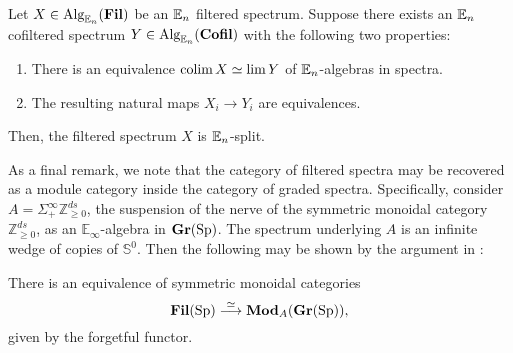 \begin{thm}\label{thm:SplitMachine}%
Let $X\in \operatorname{\text{Alg}}_{\operatorname{\mathbb{E}}_n}(\operatorname{\textbf{Fil}})$ be an $\operatorname{\mathbb{E}}_n$ filtered spectrum.  Suppose there exists an $\operatorname{\mathbb{E}}_n$ cofiltered spectrum $Y\in \operatorname{\text{Alg}}_{\operatorname{\mathbb{E}}_n}(\operatorname{\textbf{Cofil}})$ with the following two properties:
\begin{enumerate}
\item There is an equivalence $\operatorname*{\text{colim}} X \simeq \lim Y$ of $\operatorname{\mathbb{E}}_n$-algebras in spectra.
\item The resulting natural maps $X_i \to Y_i$ are equivalences.  
\end{enumerate}
Then, the filtered spectrum $X$ is $\operatorname{\mathbb{E}}_n$-split.
\end{thm}


As a final remark, we note that the category of filtered spectra may be recovered as a module category inside the category of graded spectra.  Specifically, consider $A=\Sigma^{\infty}_+ \mathbb{Z}^{ds}_{\ge 0}$, the suspension of the nerve of the symmetric monoidal category $\mathbb{Z}^{ds}_{\ge 0}$, as an $\mathbb{E}_\infty$-algebra in $\operatorname{\textbf{Gr}}(\operatorname{\text{Sp}})$.  The spectrum underlying $A$ is an infinite wedge of copies of $\mathbb{S}^0$.  Then the following may be shown by the argument in \cite[Proposition 3.1.6]{LurieRot}:

\begin{lem} \label{lem:FilAsGrMod}
There is an equivalence of symmetric monoidal categories
$$\operatorname{\textbf{Fil}}(\operatorname{\text{Sp}}) \stackrel{\simeq}{\longrightarrow} \textbf{Mod}_{A}(\operatorname{\textbf{Gr}}(\operatorname{\text{Sp}})),$$
given by the forgetful functor.
\end{lem}






